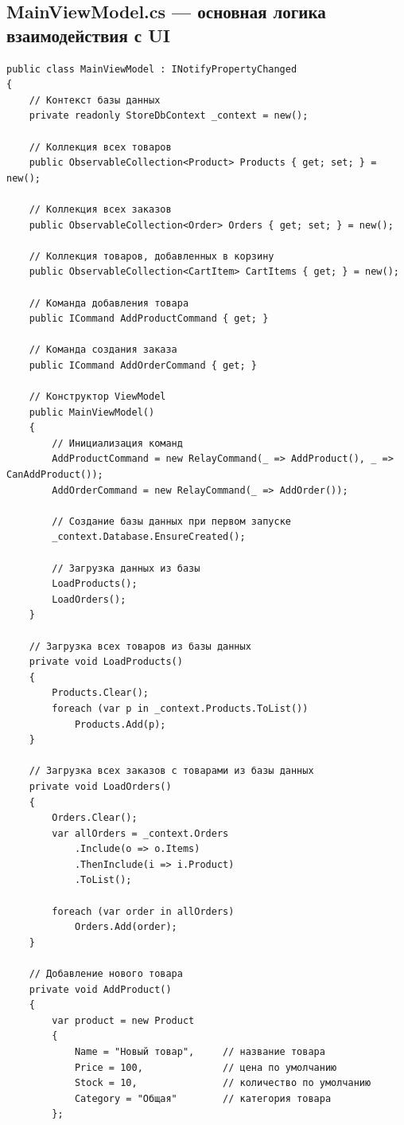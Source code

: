 \documentclass[12pt]{article}
\renewcommand{\texttt}[1]{{\small\ttfamily #1}}
\newenvironment{code}{\captionsetup{type=listing}}{}
\numberwithin{listing}{section}
\numberwithin{figure}{section}
\begin{document}
\subsection{\texttt{MainViewModel.cs} — основная логика взаимодействия с UI}
\begin{code}
	\begin{verbatim}
public class MainViewModel : INotifyPropertyChanged
{
    // Контекст базы данных
    private readonly StoreDbContext _context = new();

    // Коллекция всех товаров
    public ObservableCollection<Product> Products { get; set; } = new();

    // Коллекция всех заказов
    public ObservableCollection<Order> Orders { get; set; } = new();

    // Коллекция товаров, добавленных в корзину
    public ObservableCollection<CartItem> CartItems { get; } = new();

    // Команда добавления товара
    public ICommand AddProductCommand { get; }

    // Команда создания заказа
    public ICommand AddOrderCommand { get; }

    // Конструктор ViewModel
    public MainViewModel()
    {
        // Инициализация команд
        AddProductCommand = new RelayCommand(_ => AddProduct(), _ => CanAddProduct());
        AddOrderCommand = new RelayCommand(_ => AddOrder());

        // Создание базы данных при первом запуске
        _context.Database.EnsureCreated();

        // Загрузка данных из базы
        LoadProducts();
        LoadOrders();
    }

    // Загрузка всех товаров из базы данных
    private void LoadProducts()
    {
        Products.Clear();
        foreach (var p in _context.Products.ToList())
            Products.Add(p);
    }

    // Загрузка всех заказов с товарами из базы данных
    private void LoadOrders()
    {
        Orders.Clear();
        var allOrders = _context.Orders
            .Include(o => o.Items)
            .ThenInclude(i => i.Product)
            .ToList();

        foreach (var order in allOrders)
            Orders.Add(order);
    }

    // Добавление нового товара
    private void AddProduct()
    {
        var product = new Product
        {
            Name = "Новый товар",     // название товара
            Price = 100,              // цена по умолчанию
            Stock = 10,               // количество по умолчанию
            Category = "Общая"        // категория товара
        };


\end{verbatim}
\end{code}
\end{document}
